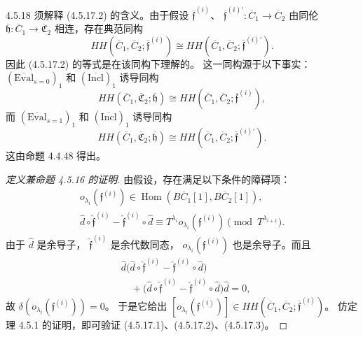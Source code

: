 \begin{remark}{4.5.18}\label{rem:4-5-18}
须解释 (4.5.17.2) 的含义。由于假设
$\overline{\mathfrak f}^{(i)}$、
$\overline{\mathfrak f}^{(i)\prime}
\colon\overline C_1\to\overline C_2$
由同伦
$\overline{\mathfrak h}\colon
\overline C_1\to\overline{\mathfrak C}_2$
相连，存在典范同构
\[
 HH(\overline C_1,\overline C_2;
 \overline{\mathfrak f}^{(i)})
 \cong
 HH(\overline C_1,\overline C_2;
 \overline{\mathfrak f}^{(i)\prime}).
\]
因此 (4.5.17.2) 的等式是在该同构下理解的。
这一同构源于以下事实：
$(\overline{\mathrm{Eval}}_{s=0})_1$
和 $(\overline{\mathrm{Incl}})_1$ 诱导同构
\[
 HH(\overline C_1,\overline{\mathfrak C}_2;
 \overline{\mathfrak h})
 \cong
 HH(\overline C_1,\overline C_2;
 \overline{\mathfrak f}^{(i)}),
\]
而 $(\overline{\mathrm{Eval}}_{s=1})_1$
和 $(\overline{\mathrm{Incl}})_1$ 诱导同构
\[
 HH(\overline C_1,\overline{\mathfrak C}_2;
 \overline{\mathfrak h})
 \cong
 HH(\overline C_1,\overline C_2;
 \overline{\mathfrak f}^{(i)\prime}).
\]
这由命题 4.4.48 得出。
\end{remark}

\begin{proof}[定义兼命题 4.5.16 的证明]
由假设，存在满足以下条件的障碍项：
\[
 \begin{gathered}
 o_{\lambda_i}(\mathfrak f^{(i)})
 \in\operatorname{Hom}
 (B\overline C_1[1],B\overline C_2[1]),\\
 \widehat d\circ\widehat{\mathfrak f}^{(i)}
 -\widehat{\mathfrak f}^{(i)}\circ\widehat d
 \equiv
 T^{\lambda_i}o_{\lambda_i}(\mathfrak f^{(i)})
 \pmod{T^{\lambda_{i+1}}}.
 \end{gathered}
\]
由于 $\widehat d$ 是余导子，
$\widehat{\mathfrak f}^{(i)}$ 是余代数同态，
$o_{\lambda_i}(\mathfrak f^{(i)})$
也是余导子。而且
\[
 \begin{aligned}
 &\widehat d\bigl(
   \widehat d\circ\widehat{\mathfrak f}^{(i)}
   -\widehat{\mathfrak f}^{(i)}\circ\widehat d\bigr)\\
 &\quad+
 \bigl(\widehat d\circ\widehat{\mathfrak f}^{(i)}
 -\widehat{\mathfrak f}^{(i)}\circ\widehat d\bigr)
 \widehat d=0,
 \end{aligned}
\]
故 $\delta(o_{\lambda_i}(\mathfrak f^{(i)}))=0$。
于是它给出
$[o_{\lambda_i}(\mathfrak f^{(i)})]
\in HH(\overline C_1,\overline C_2;
\overline{\mathfrak f}^{(i)})$。
仿定理 4.5.1 的证明，即可验证
(4.5.17.1)、(4.5.17.2)、(4.5.17.3)。
\end{proof}

